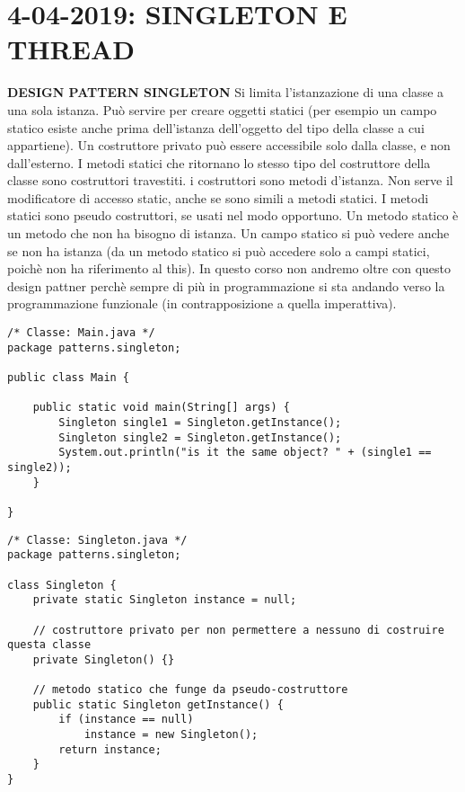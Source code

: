 

\newpage
\section{4-04-2019: SINGLETON E THREAD}
\textbf{DESIGN PATTERN SINGLETON} \newline
Si limita l'istanzazione di una classe a una sola istanza. \newline
Può servire per creare oggetti statici (per esempio un campo statico esiste anche prima dell'istanza dell'oggetto del tipo della classe a cui appartiene). \newline
Un costruttore privato può essere accessibile solo dalla classe, e non dall'esterno. \newline
I metodi statici che ritornano lo stesso tipo del costruttore della classe sono costruttori travestiti. \newline
i costruttori sono metodi d'istanza. Non serve il modificatore di accesso static, anche se sono simili a metodi statici. \newline
I metodi statici sono pseudo costruttori, se usati nel modo opportuno. \newline
Un metodo statico è un metodo che non ha bisogno di istanza. Un campo statico si può vedere anche se non ha istanza (da un metodo statico si può accedere solo a campi statici, poichè non ha riferimento al this). \newline
In questo corso non andremo oltre con questo design pattner perchè sempre di più in programmazione si sta andando verso la programmazione funzionale (in contrapposizione a quella imperattiva).


\begin{lstlisting}[basicstyle=\small,]
/* Classe: Main.java */
package patterns.singleton;

public class Main {

    public static void main(String[] args) {
        Singleton single1 = Singleton.getInstance();
        Singleton single2 = Singleton.getInstance();
        System.out.println("is it the same object? " + (single1 == single2));
    }

}

\end{lstlisting}

\begin{lstlisting}[basicstyle=\small,]
/* Classe: Singleton.java */
package patterns.singleton;

class Singleton {
    private static Singleton instance = null;

    // costruttore privato per non permettere a nessuno di costruire questa classe
    private Singleton() {}

    // metodo statico che funge da pseudo-costruttore
    public static Singleton getInstance() {
        if (instance == null)
            instance = new Singleton();
        return instance;
    }
}

\end{lstlisting}



